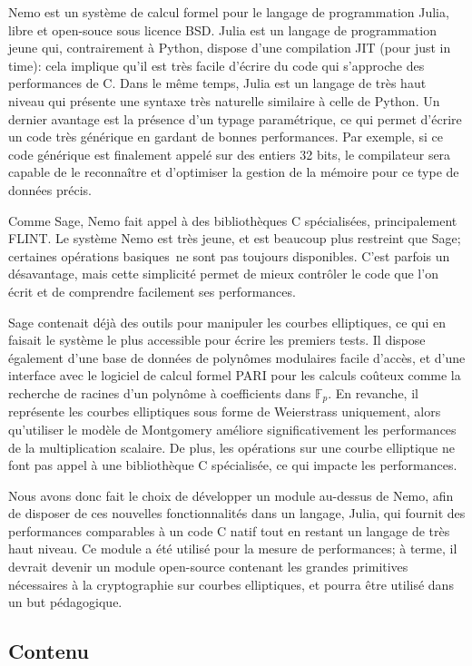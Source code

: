 \documentclass[11pt,a4paper]{article}
\newcommand{\F}{\mathbb{F}}
\renewcommand{\v}{\vspace{5mm}}
\theoremstyle{definition}
\begin{document}
Nemo est un système de calcul formel pour le langage de programmation Julia, libre et open-souce sous licence BSD. Julia est un langage de programmation jeune qui, contrairement à Python, dispose d'une compilation JIT (pour \og just in time\fg): cela implique qu'il est très facile d'écrire du code qui s'approche des performances de C. Dans le même temps, Julia est un langage de très haut niveau qui présente une syntaxe très naturelle similaire à celle de Python. Un dernier avantage est la présence d'un typage paramétrique, ce qui permet d'écrire un code très générique en gardant de bonnes performances. Par exemple, si ce code générique est finalement appelé sur des entiers 32 bits, le compilateur sera capable de le reconnaître et d'optimiser la gestion de la mémoire pour ce type de données précis.

Comme Sage, Nemo fait appel à des bibliothèques C spécialisées, principalement FLINT. Le système Nemo est très jeune, et est beaucoup plus restreint que Sage; certaines opérations \og basiques\fg\ ne sont pas toujours disponibles. C'est parfois un désavantage, mais cette simplicité permet de mieux contrôler le code que l'on écrit et de comprendre facilement ses performances.

\v
Sage contenait déjà des outils pour manipuler les courbes elliptiques, ce qui en faisait le système le plus accessible pour écrire les premiers tests. Il dispose également d'une base de données de polynômes modulaires facile d'accès, et d'une interface avec le logiciel de calcul formel PARI pour les calculs coûteux comme la recherche de racines d'un polynôme à coefficients dans $\F_p$. En revanche, il représente les courbes elliptiques sous forme de Weierstrass uniquement, alors qu'utiliser le modèle de Montgomery améliore significativement les performances de la multiplication scalaire. De plus, les opérations sur une courbe elliptique ne font pas appel à une bibliothèque C spécialisée, ce qui impacte les performances. 

Nous avons donc fait le choix de développer un module au-dessus de Nemo, afin de disposer de ces nouvelles fonctionnalités dans un langage, Julia, qui fournit des performances comparables à un code C natif tout en restant un langage de très haut niveau. Ce module a été utilisé pour la mesure de performances; à terme, il devrait devenir un module open-source contenant les grandes primitives nécessaires à la cryptographie sur courbes elliptiques, et pourra être utilisé dans un but pédagogique.


\subsection{Contenu}
\end{document}
